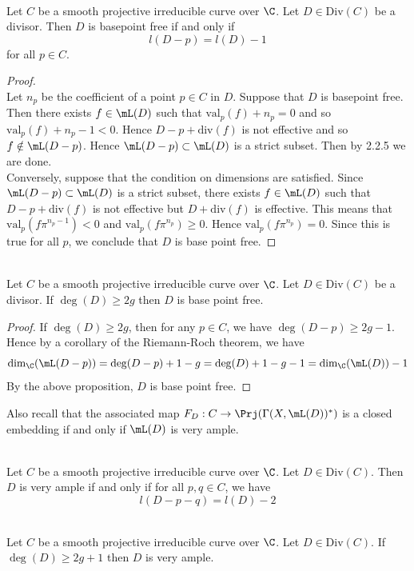 \documentclass[a4paper]{article}
\begin{document}
\begin{prp}{}{}\\
Let $C$ be a smooth projective irreducible curve over $\C$. Let $D\in\text{Div}(C)$ be a divisor. Then $D$ is basepoint free if and only if $$l(D-p)=l(D)-1$$ for all $p\in C$. 
\begin{proof}\\
Let $n_p$ be the coefficient of a point $p\in C$ in $D$. Suppose that $D$ is basepoint free. Then there exists $f\in\mL(D)$ such that $\text{val}_p(f)+n_p=0$ and so $\text{val}_p(f)+n_p-1<0$. Hence $D-p+\text{div}(f)$ is not effective and so $f\notin\mL(D-p)$. Hence $\mL(D-p)\subset\mL(D)$ is a strict subset. Then by 2.2.5 we are done. \\

Conversely, suppose that the condition on dimensions are satisfied. Since $\mL(D-p)\subset\mL(D)$ is a strict subset, there exists $f\in\mL(D)$ such that $D-p+\text{div}(f)$ is not effective but $D+\text{div}(f)$ is effective. This means that $\text{val}_p(f\pi^{n_p-1})<0$ and $\text{val}_p(f\pi^{n_p})\geq0$. Hence $\text{val}_p(f\pi^{n_p})=0$. Since this is true for all $p$, we conclude that $D$ is base point free. 
\end{proof}
\end{prp}

\begin{crl}{}{}\\
Let $C$ be a smooth projective irreducible curve over $\C$. Let $D\in\text{Div}(C)$ be a divisor. If $\deg(D)\geq 2g$ then $D$ is base point free. 
\begin{proof}
If $\deg(D)\geq 2g$, then for any $p\in C$, we have $\deg(D-p)\geq 2g-1$. Hence by a corollary of the Riemann-Roch theorem, we have $$\dim_\C(\mL(D-p))=\deg(D-p)+1-g=\deg(D)+1-g-1=\dim_\C(\mL(D))-1$$ By the above proposition, $D$ is base point free. 
\end{proof}
\end{crl}

Also recall that the associated map $F_D:C\to\Prj(\Gamma(X,\mL(D))^\ast)$ is a closed embedding if and only if $\mL(D)$ is very ample. 

\begin{prp}{}{}\\
Let $C$ be a smooth projective irreducible curve over $\C$. Let $D\in\text{Div}(C)$. Then $D$ is very ample if and only if for all $p,q\in C$, we have $$l(D-p-q)=l(D)-2$$
\end{prp}

\begin{crl}{}{}\\
Let $C$ be a smooth projective irreducible curve over $\C$. Let $D\in\text{Div}(C)$. If $\deg(D)\geq 2g+1$ then $D$ is very ample. 
\end{crl}
\end{document}
